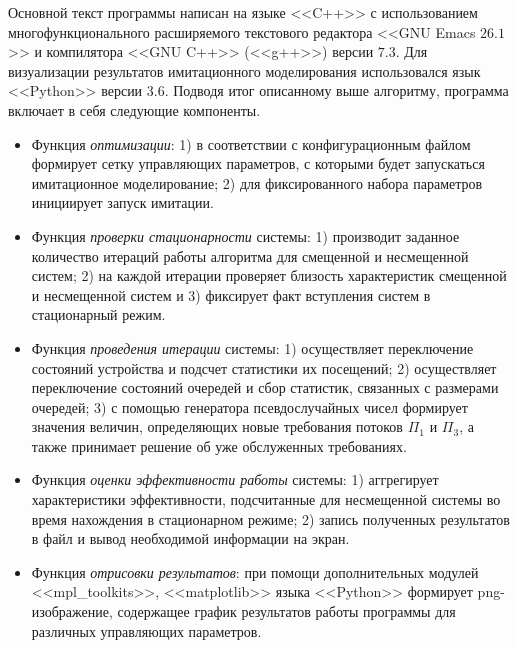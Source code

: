 Основной текст программы написан на языке <<C++>> с использованием многофункционального расширяемого текстового редактора <<GNU Emacs $26.1$>> и компилятора <<GNU C++>> (<<g++>>) версии $7.3$. Для визуализации результатов имитационного моделирования использовался язык <<Python>> версии $3.6$. Подводя итог описанному выше алгоритму, программа включает в себя следующие компоненты.
\begin{itemize}
    \item Функция \textit{оптимизации}: 1) в соответствии с конфигурационным файлом формирует сетку управляющих параметров, с которыми будет запускаться имитационное моделирование; 2) для фиксированного набора параметров инициирует запуск имитации.
    \item Функция \textit{проверки стационарности} системы: 1) производит заданное количество итераций работы алгоритма для смещенной и несмещенной систем; 2) на каждой итерации проверяет близость характеристик смещенной и несмещенной систем и 3) фиксирует факт вступления систем в стационарный режим.
    \item Функция \textit{проведения итерации} системы: 1) осуществляет переключение состояний устройства и подсчет статистики их посещений; 2) осуществляет переключение состояний очередей и сбор статистик, связанных с размерами очередей; 3) с помощью генератора псевдослучайных чисел формирует значения величин, определяющих новые требования потоков $\Pi_1$ и $\Pi_3$, а также принимает решение об уже обслуженных требованиях.
    \item Функция \textit{оценки эффективности работы} системы: 1) аггрегирует характеристики эффективности, подсчитанные для несмещенной системы во время нахождения в стационарном режиме; 2) запись полученных результатов в файл и вывод необходимой информации на экран.
    \item Функция \textit{отрисовки результатов}: при помощи дополнительных модулей <<mpl\_toolkits>>, <<matplotlib>> языка <<Python>> формирует png-изображение, содержащее график результатов работы программы для различных управляющих параметров.
\end{itemize}

